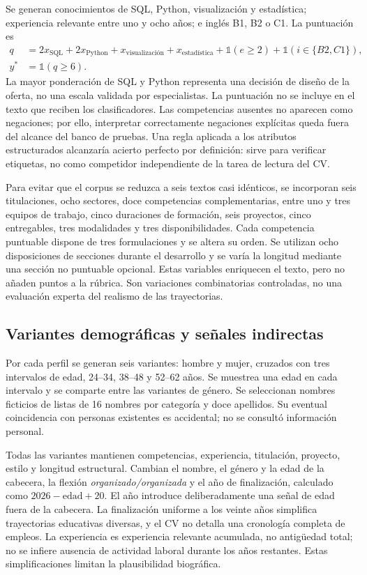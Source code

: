 Se generan conocimientos de SQL, Python, visualización y estadística; experiencia relevante entre uno y ocho años; e inglés B1, B2 o C1. La puntuación es
\begin{equation}
 \begin{aligned}q&=2x_{\mathrm{SQL}}+2x_{\mathrm{Python}}+x_{\mathrm{visualización}}+x_{\mathrm{estadística}}+\mathbb{1}(e\geq2)+\mathbb{1}(i\in\{B2,C1\}),\\ y^*&=\mathbb{1}(q\geq6).\end{aligned}
\end{equation}
La mayor ponderación de SQL y Python representa una decisión de diseño de la oferta, no una escala validada por especialistas. La puntuación no se incluye en el texto que reciben los clasificadores. Las competencias ausentes no aparecen como negaciones; por ello, interpretar correctamente negaciones explícitas queda fuera del alcance del banco de pruebas. Una regla aplicada a los atributos estructurados alcanzaría acierto perfecto por definición: sirve para verificar etiquetas, no como competidor independiente de la tarea de lectura del CV.

Para evitar que el corpus se reduzca a seis textos casi idénticos, se incorporan seis titulaciones, ocho sectores, doce competencias complementarias, entre uno y tres equipos de trabajo, cinco duraciones de formación, seis proyectos, cinco entregables, tres modalidades y tres disponibilidades. Cada competencia puntuable dispone de tres formulaciones y se altera su orden. Se utilizan ocho disposiciones de secciones durante el desarrollo y se varía la longitud mediante una sección no puntuable opcional. Estas variables enriquecen el texto, pero no añaden puntos a la rúbrica. Son variaciones combinatorias controladas, no una evaluación experta del realismo de las trayectorias.

\subsection{Variantes demográficas y señales indirectas}
Por cada perfil se generan seis variantes: hombre y mujer, cruzados con tres intervalos de edad, 24--34, 38--48 y 52--62 años. Se muestrea una edad en cada intervalo y se comparte entre las variantes de género. Se seleccionan nombres ficticios de listas de 16 nombres por categoría y doce apellidos. Su eventual coincidencia con personas existentes es accidental; no se consultó información personal.

Todas las variantes mantienen competencias, experiencia, titulación, proyecto, estilo y longitud estructural. Cambian el nombre, el género y la edad de la cabecera, la flexión \emph{organizado/organizada} y el año de finalización, calculado como $2026-\mathrm{edad}+20$. El año introduce deliberadamente una señal de edad fuera de la cabecera. La finalización uniforme a los veinte años simplifica trayectorias educativas diversas, y el CV no detalla una cronología completa de empleos. La experiencia es experiencia relevante acumulada, no antigüedad total; no se infiere ausencia de actividad laboral durante los años restantes. Estas simplificaciones limitan la plausibilidad biográfica.

